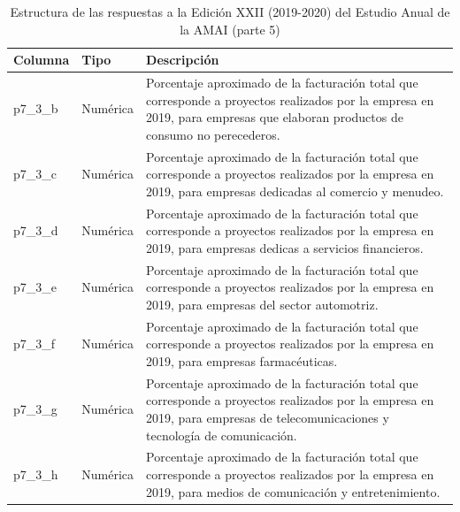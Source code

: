 \begin{table}[]
\caption{Estructura de las respuestas a la Edición XXII (2019-2020) del Estudio Anual de la AMAI (parte 5)}
\label{tab:raw2019_5}
\begin{tabular}{|l|l|l|}
\hline
Columna &
  Tipo &
  Descripción \\ \hline
p7\_3\_b &
  Numérica &
  \parbox[t]{9cm}{Porcentaje aproximado de la facturación total que corresponde a proyectos realizados por la empresa en 2019, para empresas que elaboran productos de consumo no perecederos. \vspace{0.1cm}} \\ \hline
p7\_3\_c &
  Numérica &
  \parbox[t]{9cm}{Porcentaje aproximado de la facturación total que corresponde a proyectos realizados por la empresa en 2019, para empresas dedicadas al comercio y menudeo.} \\ \hline
p7\_3\_d &
  Numérica &
  \parbox[t]{9cm}{Porcentaje aproximado de la facturación total que corresponde a proyectos realizados por la empresa en 2019, para empresas dedicas a servicios financieros. \vspace{0.1cm}} \\ \hline
p7\_3\_e &
  Numérica &
  \parbox[t]{9cm}{Porcentaje aproximado de la facturación total que corresponde a proyectos realizados por la empresa en 2019, para empresas del sector automotriz. \vspace{0.1cm}} \\ \hline
p7\_3\_f &
  Numérica &
  \parbox[t]{9cm}{Porcentaje aproximado de la facturación total que corresponde a proyectos realizados por la empresa en 2019, para empresas farmacéuticas. \vspace{0.1cm}} \\ \hline
p7\_3\_g &
  Numérica &
  \parbox[t]{9cm}{Porcentaje aproximado de la facturación total que corresponde a proyectos realizados por la empresa en 2019, para empresas de telecomunicaciones y tecnología de comunicación. \vspace{0.1cm}} \\ \hline
p7\_3\_h &
  Numérica &
  \parbox[t]{9cm}{Porcentaje aproximado de la facturación total que corresponde a proyectos realizados por la empresa en 2019, para medios de comunicación y entretenimiento.} \\ \hline
\end{tabular}
\end{table}


